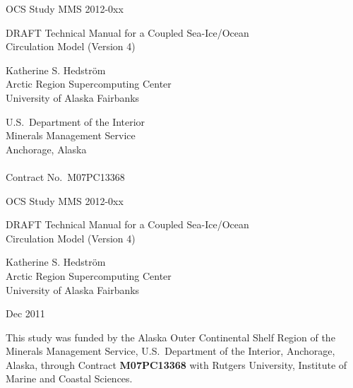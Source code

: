 %
%


\pagestyle{empty}
\centerline{\hfill OCS Study MMS 2012-0xx}
\vspace {2 cm}
\begin{center}
  {\LARGE DRAFT Technical Manual for a Coupled Sea-Ice/Ocean \\ Circulation
   Model (Version 4)  }
\end{center}
\vspace {2 cm}
\begin{center}
  Katherine S. Hedstr\"{o}m \\ Arctic Region Supercomputing Center
  \\ University of Alaska Fairbanks
\end{center}
\vspace {2 cm}
\begin{center}
  U.S.\ Department of the Interior \\ Minerals Management Service \\
  Anchorage, Alaska \\ \mbox{} \\ Contract No.\ M07PC13368
\end{center}
\newpage
\centerline{\hfill OCS Study MMS 2012-0xx}
\vspace {2 cm}
\begin{center}
  {\LARGE DRAFT Technical Manual for a Coupled Sea-Ice/Ocean \\ Circulation
   Model (Version 4)  }
\end{center}
\vspace {2 cm}
\begin{center}
  Katherine S. Hedstr\"{o}m \\ Arctic Region Supercomputing Center
  \\ University of Alaska Fairbanks
\end{center}
\vspace {2 cm}
\centerline{Dec 2011}
\vfill


This study was funded by the Alaska Outer Continental Shelf Region
of the Minerals Management Service, U.S.\ Department of the
Interior, Anchorage, Alaska, through Contract
{\bf M07PC13368} with Rutgers University, Institute of Marine
and Coastal Sciences.

